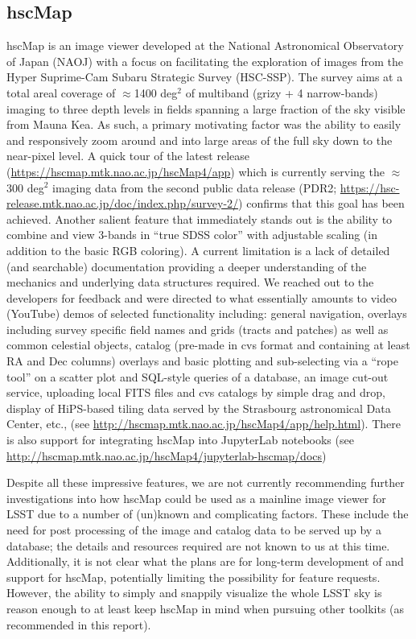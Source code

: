 \subsection{hscMap}
\label{sec:existing_tools:hscMap}
hscMap is an image viewer developed at the National Astronomical Observatory of Japan (NAOJ) with a focus on facilitating the exploration of images from the Hyper Suprime-Cam Subaru Strategic Survey (HSC-SSP).
The survey aims at a total areal coverage of $\approx$1400 deg$^2$ of multiband (grizy + 4 narrow-bands) imaging to three depth levels in fields spanning a large fraction of the sky visible from Mauna Kea.
As such, a primary motivating factor was the ability to easily and responsively zoom around and into large areas of the full sky down to the near-pixel level.
A quick tour of the latest release (\url{https://hscmap.mtk.nao.ac.jp/hscMap4/app}) which is currently serving the $\approx$300 deg$^2$ imaging data from the second public data release (PDR2; \url{https://hsc-release.mtk.nao.ac.jp/doc/index.php/survey-2/}) confirms that this goal has been achieved.
Another salient feature that immediately stands out is the ability to combine and view 3-bands in ``true SDSS color'' \citep{2004PASP..116..133L} with adjustable scaling (in addition to the basic RGB coloring).
A current limitation is a lack of detailed (and searchable) documentation providing a deeper understanding of the mechanics and underlying data structures required.
We reached out to the developers for feedback and were directed to what essentially amounts to video (YouTube) demos of selected functionality including: general navigation, overlays including survey specific field names and grids (tracts and patches) as well as common celestial objects, catalog (pre-made in cvs format and containing at least RA and Dec columns) overlays and basic plotting and sub-selecting via a ``rope tool'' on a scatter plot and SQL-style queries of a database, an image cut-out service, uploading local FITS files and cvs catalogs by simple drag and drop, display of HiPS-based tiling data served by the Strasbourg astronomical Data Center, etc., (see \url{http://hscmap.mtk.nao.ac.jp/hscMap4/app/help.html}).
There is also support for integrating hscMap into JupyterLab notebooks (see \url{http://hscmap.mtk.nao.ac.jp/hscMap4/jupyterlab-hscmap/docs})

Despite all these impressive features, we are not currently recommending further investigations into how hscMap could be used as a mainline image viewer for LSST due to a number of (un)known and complicating factors.
These include the need for post processing of the image and catalog data to be served up by a database; the details and resources required are not known to us at this time.
Additionally, it is not clear what the plans are for long-term development of and support for hscMap, potentially limiting the possibility for feature requests.
However, the ability to simply and snappily visualize the whole LSST sky is reason enough to at least keep hscMap in mind when pursuing other toolkits (as recommended in this report).


